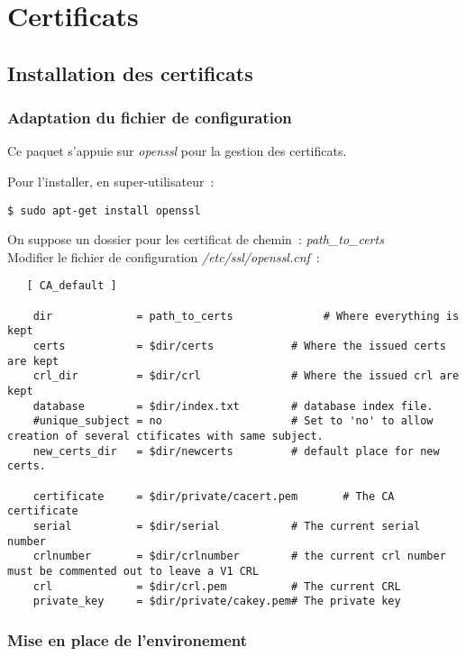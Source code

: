 \section{Certificats}
\subsection{Installation des certificats}
\subsubsection{Adaptation du fichier de configuration}

Ce paquet s'appuie sur \emph{openssl} pour la gestion des certificats.

Pour l'installer, en super-utilisateur~:

\begin{lstlisting}
$ sudo apt-get install openssl
\end{lstlisting}

On suppose un dossier pour les certificat de chemin~: \emph{path\_to\_certs}\\

Modifier le fichier de configuration \emph{/etc/ssl/openssl.cnf}~:

\begin{lstlisting}
   [ CA_default ]

    dir             = path_to_certs              # Where everything is kept
    certs           = $dir/certs            # Where the issued certs are kept
    crl_dir         = $dir/crl              # Where the issued crl are kept
    database        = $dir/index.txt        # database index file.
    #unique_subject = no                    # Set to 'no' to allow creation of several ctificates with same subject.
    new_certs_dir   = $dir/newcerts         # default place for new certs.

    certificate     = $dir/private/cacert.pem       # The CA certificate
    serial          = $dir/serial           # The current serial number
    crlnumber       = $dir/crlnumber        # the current crl number must be commented out to leave a V1 CRL
    crl             = $dir/crl.pem          # The current CRL
    private_key     = $dir/private/cakey.pem# The private key
\end{lstlisting}

\subsubsection{Mise en place de l'environement}

